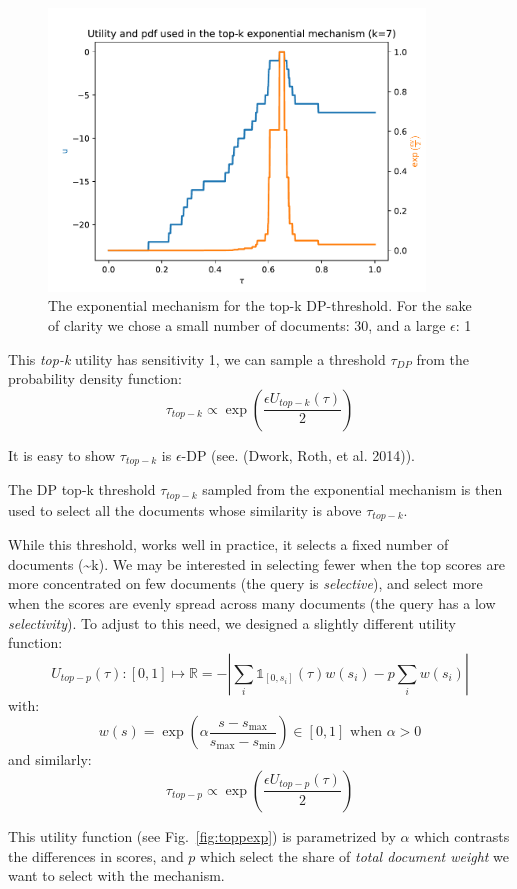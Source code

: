 \documentclass[
  12pt,
  a4paper,
]{article}
\begin{document}
\begin{figure}
\centering
\includegraphics[width=100mm,height=\textheight,keepaspectratio]{figures/top-k-exp.pdf}
\caption{The exponential mechanism for the top-k DP-threshold. For the
sake of clarity we chose a small number of documents: 30, and a large
\(\epsilon\): 1}\label{fig:topkexp}
\end{figure}

This \emph{top-k} utility has sensitivity 1, we can sample a threshold
\(\tau_{DP}\) from the probability density function:
\[\tau_{top-k}\propto\exp\left(\frac{\epsilon U_{top-k}(\tau)}{2}\right)\]

It is easy to show \(\tau_{top-k}\) is \(\epsilon\)-DP (see. (Dwork,
Roth, et al. 2014)).

The DP top-k threshold \(\tau_{top-k}\) sampled from the exponential
mechanism is then used to select all the documents whose similarity is
above \(\tau_{top-k}\).

While this threshold, works well in practice, it selects a fixed number
of documents (\textasciitilde k). We may be interested in selecting
fewer when the top scores are more concentrated on few documents (the
query is \emph{selective}), and select more when the scores are evenly
spread across many documents (the query has a low \emph{selectivity}).
To adjust to this need, we designed a slightly different utility
function:
\[U_{top-p}(\tau): [0, 1] \mapsto \mathbb{R} = -\left|\sum_i\mathbb{1}_{[0, s_i]}(\tau)w(s_i)-p\sum_i w(s_i)\right|\]
with:
\[w(s) = \exp\left(\alpha\frac{s-s_{\max}}{s_{\max}-s_{\min}}\right) \in [0, 1] \text{ when } \alpha>0\]
and similarly:
\[\tau_{top-p}\propto\exp\left(\frac{\epsilon U_{top-p}(\tau)}{2}\right)\]

This utility function (see Fig.~\ref{fig:toppexp}) is parametrized by
\(\alpha\) which contrasts the differences in scores, and \(p\) which
select the share of \emph{total document weight} we want to select with
the mechanism.
\end{document}
